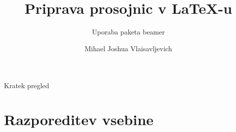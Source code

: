 \documentclass{beamer}
\title{Priprava prosojnic v LaTeX-u}
\subtitle{Uporaba paketa beamer}
\author{Mihael Joshua Vlaisavljevich}
\institute[FMF]{Fakulteta za matematiko in fiziko}
\date{}
\begin{document}

\maketitle


   \begin{frame}{Kratek pregled}
\tableofcontents[pausesections]
   \end{frame}

\section{Razporeditev vsebine}

\end{document}
